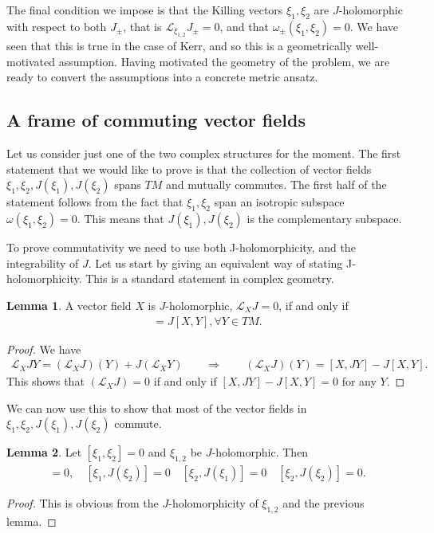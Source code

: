 \documentclass[10pt]{report}
\theoremstyle{definition}
\newtheorem{lemma}{Lemma}[chapter]
\begin{document}
The final condition we impose is that the Killing vectors $\xi_1,\xi_2$ are $J$-holomorphic with respect to both $J_\pm$, that is ${\mathcal L}_{\xi_{1,2}} J_\pm=0$, and that $\omega_\pm(\xi_1,\xi_2)=0$. We have seen that this is true in the case of Kerr, and so this is a geometrically well-motivated assumption. Having motivated the geometry of the problem, we are ready to convert the assumptions into a concrete metric ansatz. 

\subsection{A frame of commuting vector fields}

Let us consider just one of the two complex structures for the moment. The first statement that we would like to prove is that the collection of vector fields $\xi_1,\xi_2,J(\xi_1),J(\xi_2)$ spans $TM$ and mutually commutes. The first half of the statement follows from the fact that $\xi_1,\xi_2$ span an isotropic subspace $\omega(\xi_1,\xi_2)=0$. This means that $J(\xi_1),J(\xi_2)$ is the complementary subspace. 

To prove commutativity we need to use both J-holomorphicity, and the integrability of $J$. Let us start by giving an equivalent way of stating J-holomorphicity. This is a standard statement in complex geometry.
\begin{lemma} A vector field $X$ is $J$-holomorphic, ${\mathcal L}_X J=0$, if and only if
     \begin{align}
        [X,JY]=J[X,Y], \forall Y\in TM.
     \end{align}
\end{lemma}
\begin{proof} We have
\begin{align}
{\mathcal L}_X JY = ({\mathcal L}_X J)(Y) + J({\mathcal L}_X Y) \qquad \Rightarrow \qquad ({\mathcal L}_X J)(Y) = [X,JY]- J[X,Y].
\end{align}
This shows that $({\mathcal L}_X J)=0$ if and only if $[X,JY]- J[X,Y]=0$ for any $Y$.
\end{proof}

We can now use this to show that most of the vector fields in $\xi_1,\xi_2,J(\xi_1),J(\xi_2)$ commute. 
\begin{lemma} Let $[\xi_1,\xi_2]=0$ and $\xi_{1,2}$ be $J$-holomorphic. Then 
\begin{align} 
[\xi_1, J(\xi_1)] =0, \quad [\xi_1, J(\xi_2)] =0 \quad [\xi_2, J(\xi_1)] =0  \quad [\xi_2, J(\xi_2)] =0.
\end{align}
\end{lemma}
\begin{proof} This is obvious from the $J$-holomorphicity of $\xi_{1,2}$ and the previous lemma. 
\end{proof}
\end{document}
